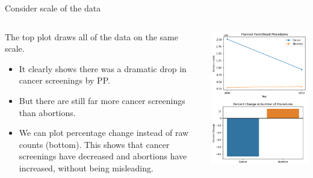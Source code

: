 \documentclass[aspectratio=169]{../latex_main/tntbeamer}  %
\begin{document}
	\begin{frame}{Consider scale of the data}
	
	    \vspace{-2em}
	    \begin{columns}
	        \begin{column}{.55\textwidth}
	        
	            The top plot draws all of the data on the same scale.
	            \begin{itemize}
	                \item It clearly shows there was a dramatic drop in cancer screenings by PP.
	                \item But there are still far more cancer screenings than abortions.
	                \item  We can plot percentage change instead of raw counts (bottom). This shows that cancer screenings have decreased and abortions have increased, without being misleading.

	            \end{itemize} 
	        \end{column}
	        
	        
	        \begin{column}{.4\textwidth}

	                    \centering
	                    \includegraphics[scale=.35]{Bild52}
	                    
	        \end{column}
	    \end{columns}
	\end{frame}
	
\end{document}
